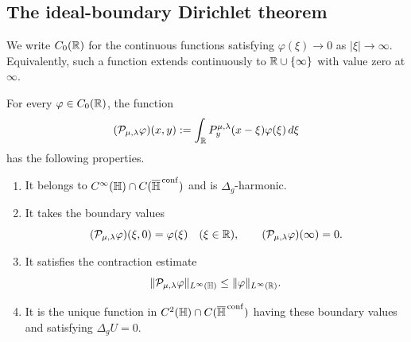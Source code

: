 \subsection{The ideal-boundary Dirichlet theorem}

We write $C_0(\mathbb{R})$ for the continuous functions satisfying
$\varphi(\xi)\to0$ as $|\xi|\to\infty$.  Equivalently, such a function
extends continuously to $\mathbb{R}\cup\{\infty\}$ with value zero at $\infty$.

\begin{theorem}
\label{thm:C0-poisson-dirichlet}
For every $\varphi\in C_0(\mathbb{R})$, the function
\begin{equation}\label{eq:poisson-extension-x}
 (\mathcal P_{\mu,\lambda}\varphi)(x,y)
 :=\int_{\mathbb{R}}P^{\mu,\lambda}_y(x-\xi)\varphi(\xi)\,d\xi
\end{equation}
has the following properties.
\begin{enumerate}
\item It belongs to $C^\infty(\mathbb{H})\cap
 C(\overline{\mathbb{H}}^{\,\mathrm{conf}})$ and is $\Delta_g$-harmonic.
\item It takes the boundary values
\[
 (\mathcal P_{\mu,\lambda}\varphi)(\xi,0)=\varphi(\xi)
 \quad(\xi\in\mathbb{R}),
 \qquad
 (\mathcal P_{\mu,\lambda}\varphi)(\infty)=0.
\]
\item It satisfies the contraction estimate
\begin{equation}\label{eq:poisson-sup-contraction}
 \|\mathcal P_{\mu,\lambda}\varphi\|_{L^\infty(\mathbb{H})}
 \leq\|\varphi\|_{L^\infty(\mathbb{R})}.
\end{equation}
\item It is the unique function in
$C^2(\mathbb{H})\cap C(\overline{\mathbb{H}}^{\,\mathrm{conf}})$ having these boundary
values and satisfying $\Delta_gU=0$.
\end{enumerate}
\end{theorem}


